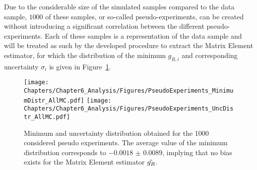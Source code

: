 Due to the considerable size of the simulated samples compared to the data sample, $1 000$ of these samples, or so-called pseudo-experiments, can be created without introducing a significant correlation between the different pseudo-experiments.
Each of these samples is a representation of the data sample and will be treated as such by the developed procedure to extract the Matrix Element estimator, for which the distribution of the minimum $g_{R,i}$ and corresponding uncertainty $\sigma_i$ is given in Figure~\ref{fig::MinAndUnc}.
\begin{figure}[h!t]
 \centering
 \texttt{[image: Chapters/Chapter6\_Analysis/Figures/PseudoExperiments\_MinimumDistr\_AllMC.pdf]} \hspace{0.5cm}
 \texttt{[image: Chapters/Chapter6\_Analysis/Figures/PseudoExperiments\_UncDistr\_AllMC.pdf]}
 \caption{Minimum and uncertainty distribution obtained for the 1000 considered pseudo experiments. The average value of the minimum distribution corresponds to $-0.0018$ $\pm$ $0.0089$, implying that no bias exists for the Matrix Element estimator $\hat{g_{R}}$.}  \label{fig::MinAndUnc}
\end{figure}

